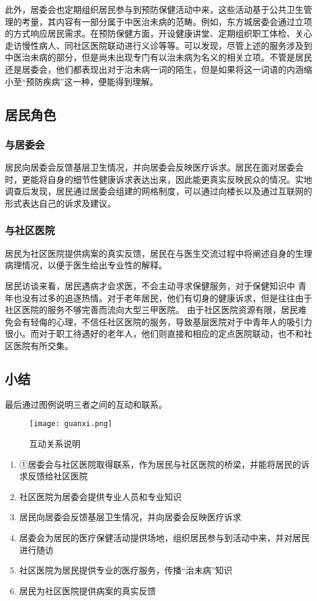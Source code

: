 此外，居委会也定期组织居民参与到预防保健活动中来，这些活动基于公共卫生管理的考量，其内容有一部分属于中医治未病的范畴。例如，东方城居委会通过立项的方式响应居民需求。在预防保健方面，开设健康讲堂、定期组织职工体检、关心走访慢性病人、同社区医院联动进行义诊等等。可以发现，尽管上述的服务涉及到中医治未病的部分，但是尚未出现专门有以治未病为名义的相关立项。不管是居民还是居委会，他们都表现出对于治未病一词的陌生，但是如果将这一词语的内涵缩小至“预防疾病”这一种，便能得到理解。

\subsection{居民角色}
\subsubsection{与居委会}
居民向居委会反馈基层卫生情况，并向居委会反映医疗诉求。居民在面对居委会时，更能将自身的细节性健康诉求表达出来，因此能更真实反映民众的情况。实地调查后发现，居民通过居委会组建的网格制度，可以通过向楼长以及通过互联网的形式表达自己的诉求及建议。
\subsubsection{与社区医院}
居民为社区医院提供病案的真实反馈，居民在与医生交流过程中将阐述自身的生理病理情况，以便于医生给出专业性的解释。

居民访谈来看，居民遇病才会求医，不会主动寻求保健服务，对于保健知识中 青年也没有过多的追逐热情。对于老年居民，他们有切身的健康诉求，但是往往由于社区医院的服务不够完善而流向大型三甲医院。
由于社区医院资源有限，居民难免会有轻侮的心理，不信任社区医院的服务，导致基层医院对于中青年人的吸引力很小。而对于职工待遇好的老年人，他们则直接和相应的定点医院联动，也不和社区医院有所交集。
\subsection{小结}
最后通过图例说明三者之间的互动和联系。

\begin{figure}[h]
    \texttt{[image: guanxi.png]}
    \centering
    \caption{互动关系说明}
\end{figure}
\begin{spacing}{0.9}
\begin{enumerate}
    \item ①居委会与社区医院取得联系，作为居民与社区医院的桥梁，并能将居民的诉求反馈给社区医院
    \item 社区医院为居委会提供专业人员和专业知识
    \item 居民向居委会反馈基层卫生情况，并向居委会反映医疗诉求
    \item 居委会为居民的医疗保健活动提供场地，组织居民参与到活动中来，并对居民进行随访
    \item 社区医院为居民提供专业的医疗服务，传播“治未病”知识
    \item 居民为社区医院提供病案的真实反馈
\end{enumerate}
\end{spacing}